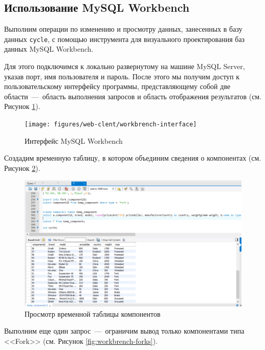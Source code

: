 \subsection{Использование MySQL Workbench}

Выполним операции по изменению и просмотру данных, занесенных в базу данных \texttt{cycle}, с помощью инструмента для визуального проектирования баз данных MySQL Workbench.

Для этого подключимся к локально развернутому на машине MySQL Server, указав порт, имя пользователя и пароль. После этого мы получим доступ к пользовательскому интерфейсу программы, представляющему собой две области~---~область выполнения запросов и область отображения результатов (см. Рисунок \ref{fig:workbrench-interface}).

\begin{figure}[h!]
	\centering
	\texttt{[image: figures/web-clent/workbrench-interface]}
	\caption{Интерфейс MySQL Workbench}
	\label{fig:workbrench-interface}
\end{figure}

Создадим временную таблицу, в котором объединим сведения о компонентах (см. Рисунок \ref{fig:workbrench-components}).
\begin{figure}[h!]
	\centering
	\includegraphics[width=1\linewidth]{figures/web-clent/workbrench-components}
	\caption{Просмотр временной таблицы компонентов}
	\label{fig:workbrench-components}
\end{figure}

Выполним еще один запрос~---~ограничим вывод только компонентами типа <<Fork>> (см. Рисунок \ref{fig:workbrench-forks}).

